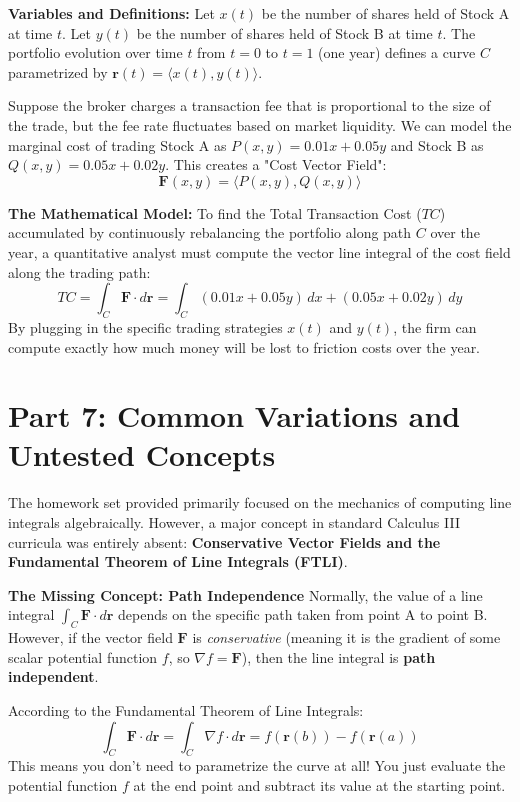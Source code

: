 \documentclass{article}
\begin{document}
\textbf{Variables and Definitions:}
Let $x(t)$ be the number of shares held of Stock A at time $t$.
Let $y(t)$ be the number of shares held of Stock B at time $t$.
The portfolio evolution over time $t$ from $t=0$ to $t=1$ (one year) defines a curve $C$ parametrized by $\mathbf{r}(t) = \langle x(t), y(t) \rangle$.

Suppose the broker charges a transaction fee that is proportional to the size of the trade, but the fee rate fluctuates based on market liquidity. We can model the marginal cost of trading Stock A as $P(x,y) = 0.01x + 0.05y$ and Stock B as $Q(x,y) = 0.05x + 0.02y$. This creates a "Cost Vector Field": 
\[ \mathbf{F}(x,y) = \langle P(x,y), Q(x,y) \rangle \]

\textbf{The Mathematical Model:}
To find the Total Transaction Cost ($TC$) accumulated by continuously rebalancing the portfolio along path $C$ over the year, a quantitative analyst must compute the vector line integral of the cost field along the trading path:
\[ TC = \int_C \mathbf{F} \cdot d\mathbf{r} = \int_C (0.01x + 0.05y) \, dx + (0.05x + 0.02y) \, dy \]
By plugging in the specific trading strategies $x(t)$ and $y(t)$, the firm can compute exactly how much money will be lost to friction costs over the year.

\newpage

\section{Part 7: Common Variations and Untested Concepts}

The homework set provided primarily focused on the mechanics of computing line integrals algebraically. However, a major concept in standard Calculus III curricula was entirely absent: \textbf{Conservative Vector Fields and the Fundamental Theorem of Line Integrals (FTLI)}.

\textbf{The Missing Concept: Path Independence}
Normally, the value of a line integral $\int_C \mathbf{F} \cdot d\mathbf{r}$ depends on the specific path taken from point A to point B. However, if the vector field $\mathbf{F}$ is \textit{conservative} (meaning it is the gradient of some scalar potential function $f$, so $\nabla f = \mathbf{F}$), then the line integral is \textbf{path independent}. 

According to the Fundamental Theorem of Line Integrals:
\[ \int_C \mathbf{F} \cdot d\mathbf{r} = \int_C \nabla f \cdot d\mathbf{r} = f(\mathbf{r}(b)) - f(\mathbf{r}(a)) \]
This means you don't need to parametrize the curve at all! You just evaluate the potential function $f$ at the end point and subtract its value at the starting point.
\end{document}
